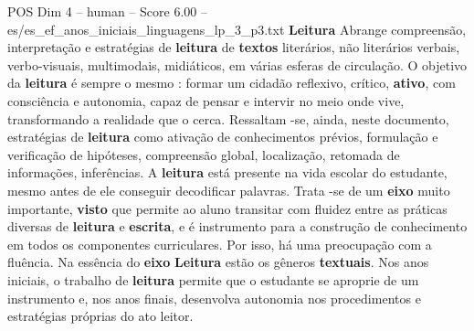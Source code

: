 \begin{textsample}{POS Dim 4 – human – Score 6.00 – es/es\_ef\_anos\_iniciais\_linguagens\_lp\_3\_p3.txt}  \label{ex:f4_pos_007}
\textbf{Leitura} Abrange compreensão, interpretação e estratégias de \textbf{leitura} de \textbf{textos} literários, não literários verbais, verbo-visuais, multimodais, midiáticos, em várias esferas de circulação.
O objetivo da \textbf{leitura} é sempre o mesmo : formar um cidadão reflexivo, crítico, \textbf{ativo}, com consciência e autonomia, capaz de pensar e intervir no meio onde vive, transformando a realidade que o cerca.
Ressaltam -se, ainda, neste documento, estratégias de \textbf{leitura} como ativação de conhecimentos prévios, formulação e verificação de hipóteses, compreensão global, localização, retomada de informações, inferências.
A \textbf{leitura} está presente na vida escolar do estudante, mesmo antes de ele conseguir decodificar palavras.
Trata -se de um \textbf{eixo} muito importante, \textbf{visto} que permite ao aluno transitar com fluidez entre as práticas diversas de \textbf{leitura} e \textbf{escrita}, e é instrumento para a construção de conhecimento em todos os componentes curriculares.
Por isso, há uma preocupação com a fluência.
Na essência do \textbf{eixo} \textbf{Leitura} estão os gêneros \textbf{textuais}.
Nos anos iniciais, o trabalho de \textbf{leitura} permite que o estudante se aproprie de um instrumento e, nos anos finais, desenvolva autonomia nos procedimentos e estratégias próprias do ato leitor.

\end{textsample}

